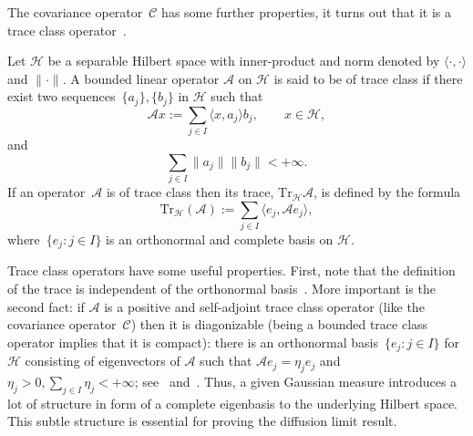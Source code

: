 The covariance operator~$\mathcal{C}$ has some further properties, it turns out that it is a trace class operator~\autocite[Proposition 2.15]{DaPrato1992}.

\begin{defin}\autocite[Section 1.1]{DaPrato2002}
\label{DLR-Setting: Definition trace class}
 Let $\mathcal{H}$ be a separable Hilbert space with inner-product and norm denoted by $\langle \cdot, \cdot \rangle$ and $\| \cdot \|$. A bounded linear operator $\mathcal{A}$ on $\mathcal{H}$ is said to be of trace class if there exist two sequences~$\{ a_j \}, \{ b_j \}$ in $\mathcal{H}$ such that
 \begin{equation*}
  \mathcal{A}x := \sum_{j \in I} \langle x, a_j \rangle b_j, \qquad x \in \mathcal{H},
 \end{equation*}
 and
 \begin{equation*}
  \sum_{j \in I} \| a_j \| \| b_j \| < + \infty.
 \end{equation*}
 If an operator~$\mathcal{A}$ is of trace class then its trace, $\text{Tr}_{\mathcal{H}}\mathcal{A}$, is defined by the formula
 \begin{equation}
  \text{Tr}_{\mathcal{H}}(\mathcal{A}) := \sum_{j \in I} \langle e_j, \mathcal{A} e_j \rangle,
 \end{equation}
 where~$\{ e_j : j \in I \}$  is an orthonormal and complete basis on $\mathcal{H}$.

\end{defin}

Trace class operators have some useful properties. First, note that the definition of the trace is independent of the orthonormal basis~\autocite[Proposition C.1]{DaPrato1992}. More important is the second fact: if $\mathcal{A}$ is a positive and self-adjoint trace class operator (like the covariance operator~$\mathcal{C}$) then it is diagonizable (being a bounded trace class operator implies that it is compact): there is an orthonormal basis~$\{ e_j : j \in I \}$ for $\mathcal{H}$ consisting of eigenvectors of $\mathcal{A}$ such that $\mathcal{A} e_j = \eta_j e_j $ and $\eta_j > 0, \sum_{j \in I} \eta_j < + \infty$; see~\autocite[Lemma 6.32]{Dashti2014} and~\autocite[Proposition 3.15]{Hairer2009}. Thus, a given Gaussian measure introduces a lot of structure in form of a complete eigenbasis to the underlying Hilbert space. This subtle structure is essential for proving the diffusion limit result.


